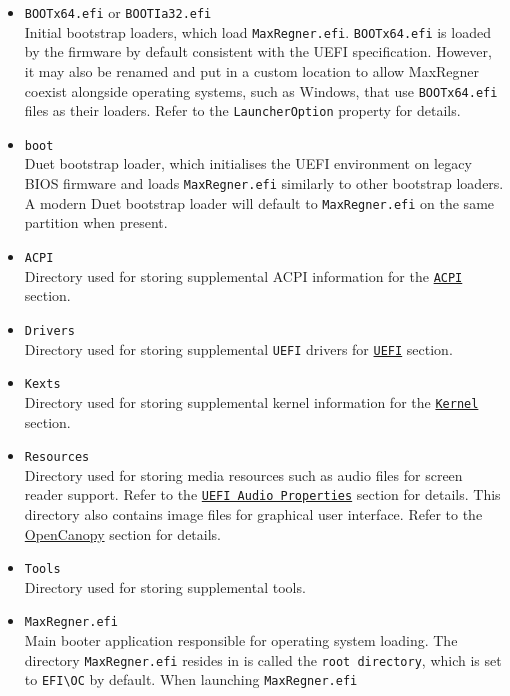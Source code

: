 \documentclass[]{article}
\providecommand{\tightlist}{%
  \setlength{\itemsep}{0pt}\setlength{\parskip}{0pt}}
\begin{document}
\begin{itemize}
\tightlist
\item
  \texttt{BOOTx64.efi} or \texttt{BOOTIa32.efi} \\
  Initial bootstrap loaders, which load \texttt{MaxRegner.efi}. \texttt{BOOTx64.efi}
  is loaded by the firmware by default consistent with the UEFI specification. However,
  it may also be renamed and put in a custom location to allow MaxRegner coexist alongside
  operating systems, such as Windows, that use \texttt{BOOTx64.efi} files as their loaders.
  Refer to the \texttt{LauncherOption} property for details.
\item
  \texttt{boot} \\
  Duet bootstrap loader, which initialises the UEFI environment on legacy BIOS firmware
  and loads \texttt{MaxRegner.efi} similarly to other bootstrap loaders. A modern Duet
  bootstrap loader will default to \texttt{MaxRegner.efi} on the same partition when
  present.
\item
  \texttt{ACPI} \\
  Directory used for storing supplemental ACPI information
  for the \hyperref[acpi]{\texttt{ACPI}} section.
\item
  \texttt{Drivers} \\
  Directory used for storing supplemental \texttt{UEFI}
  drivers for \hyperref[uefi]{\texttt{UEFI}} section.
\item
  \texttt{Kexts} \\
  Directory used for storing supplemental kernel information
  for the \hyperref[kernel]{\texttt{Kernel}} section.
\item
  \texttt{Resources} \\
  Directory used for storing media resources such as audio files
  for screen reader support. Refer to the \hyperref[uefiaudioprops]{\texttt{UEFI Audio Properties}}
  section for details. This directory also contains image files
  for graphical user interface. Refer to the \hyperref[ueficanopy]{OpenCanopy} section for details.
\item
  \texttt{Tools} \\
  Directory used for storing supplemental tools.
\item
  \texttt{MaxRegner.efi} \\
  Main booter application responsible for operating system loading. The directory
  \texttt{MaxRegner.efi} resides in is called the \texttt{root directory}, which is
  set to \texttt{EFI\textbackslash OC} by default. When launching \texttt{MaxRegner.efi}

\end{itemize}
\end{document}
